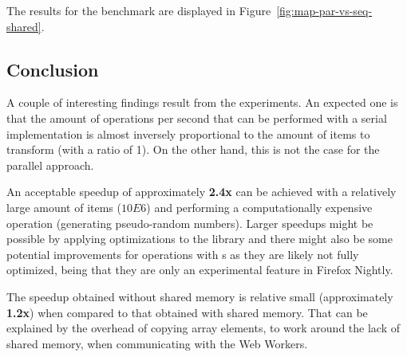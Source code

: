 The results for the benchmark are displayed in Figure~\ref{fig:map-par-vs-seq-shared}.

\subsection{Conclusion}
A couple of interesting findings result from the experiments. An expected one is that the amount of operations per second that can be performed with a serial implementation is almost inversely proportional to the amount of items to transform (with a ratio of 1). On the other hand, this is not the case for the parallel approach.

An acceptable speedup of approximately \textbf{2.4x} can be achieved with a relatively large amount of items (\(10E6\)) and performing a computationally expensive operation (generating pseudo-random numbers). Larger speedups might be possible by applying optimizations to the library and there might also be some potential improvements for operations with \tsabuffer{}s as they are likely not fully optimized, being that they are only an experimental feature in Firefox Nightly.

The speedup obtained without shared memory is relative small (approximately \textbf{1.2x}) when compared to that obtained with shared memory. That can be explained by the overhead of copying array elements, to work around the lack of shared memory, when communicating with the Web Workers.

\pagebreak